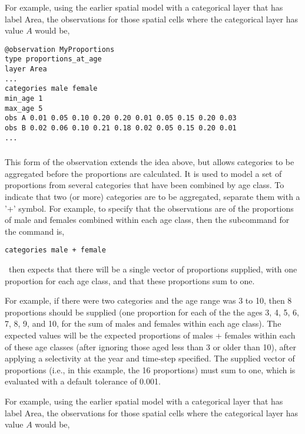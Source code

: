{{For example, using the earlier spatial model with a categorical layer that has label Area, the observations for those spatial cells where the categorical layer has value $A$ would be, 

{\small{\begin{verbatim}
@observation MyProportions
type proportions_at_age
layer Area
...
categories male female
min_age 1
max_age 5
obs A 0.01 0.05 0.10 0.20 0.20 0.01 0.05 0.15 0.20 0.03
obs B 0.02 0.06 0.10 0.21 0.18 0.02 0.05 0.15 0.20 0.01
...
\end{verbatim}

\subsubsection*{}

This form of the observation extends the idea above, but allows categories to be aggregated before the proportions are calculated. It is used to model a set of proportions from several categories that have been combined by age class. To indicate that two (or more) categories are to be aggregated, separate them with a '+' symbol. For example, to specify that the observations are of the proportions of male and females combined within each age class, then the subcommand  for the  command is,

{\small{\begin{verbatim}
categories male + female
\end{verbatim}}}

\SPM\ then expects that there will be a single vector of proportions supplied, with one proportion for each age class, and that these proportions sum to one. 

For example, if there were two categories and the age range was 3 to 10, then 8 proportions should be supplied (one proportion for each of the the ages 3, 4, 5, 6, 7, 8, 9, and 10, for the sum of males and females within each age class). The expected values will be the expected proportions of males + females within each of these age classes (after ignoring those aged less than 3 or older than 10), after applying a selectivity at the year and time-step specified. The supplied vector of proportions (i.e., in this example, the 16 proportions) must sum to one, which is evaluated with a default tolerance of 0.001. 

For example, using the earlier spatial model with a categorical layer that has label Area, the observations for those spatial cells where the categorical layer has value $A$ would be, 

}}}}
